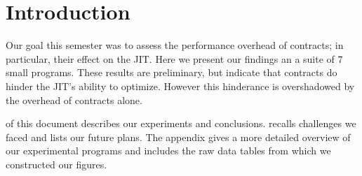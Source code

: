 \section{Introduction}
\label{intro}

Our goal this semester was to assess the performance overhead of contracts; in particular, their effect on the JIT.
Here we present our findings an a suite of 7 small programs.
These results are preliminary, but indicate that contracts do hinder the JIT's ability to optimize.
However this hinderance is overshadowed by the overhead of contracts alone.

 of this document describes our experiments and conclusions.
 recalls challenges we faced and lists our future plans.
The appendix gives a more detailed overview of our experimental programs and includes the raw data tables from which we constructed our figures.
